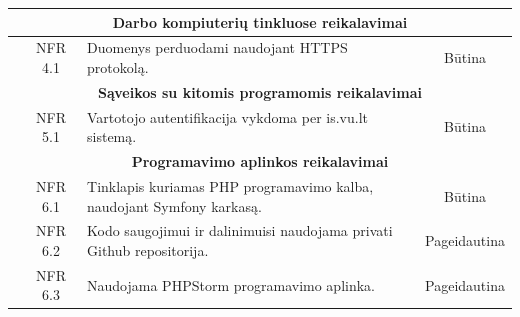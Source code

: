\documentclass{VUMIFPSkursinis}
\begin{document}
\begin{table}[H]
\begin{tabular}{|p{1cm}|p{1cm}|p{}|p{}|}
	\hline
\multicolumn{4}{|c|}{\bfseries Darbo kompiuterių tinkluose reikalavimai}\\		
			
	\hline
		\multicolumn{1}{|c}{}&
		\multicolumn{1}{c|}{NFR 4.1}&
		{Duomenys perduodami naudojant HTTPS protokolą.
		}&
		\multicolumn{1}{c|}{Būtina}\\	
		
	\hline
\multicolumn{4}{|c|}{\bfseries Sąveikos su kitomis programomis reikalavimai}\\	
\hline
		\multicolumn{1}{|c}{}&
		\multicolumn{1}{c|}{NFR 5.1}&
		{Vartotojo autentifikacija vykdoma per is.vu.lt sistemą.
		}&
		\multicolumn{1}{c|}{Būtina}\\
		
	\hline
\multicolumn{4}{|c|}{\bfseries Programavimo aplinkos reikalavimai}\\	
\hline
		\multicolumn{1}{|c}{}&
		\multicolumn{1}{c|}{NFR 6.1}&
		{Tinklapis kuriamas PHP programavimo kalba, naudojant
Symfony karkasą.
		}&
		\multicolumn{1}{c|}{Būtina}\\		

\hline
		\multicolumn{1}{|c}{}&
		\multicolumn{1}{c|}{NFR 6.2}&
		{Kodo saugojimui ir dalinimuisi naudojama privati Github repositorija.
		}&
		\multicolumn{1}{c|}{Pageidautina}\\	
		
\hline
		\multicolumn{1}{|c}{}&
		\multicolumn{1}{c|}{NFR 6.3}&
		{Naudojama PHPStorm programavimo aplinka.
		}&
		\multicolumn{1}{c|}{Pageidautina}\\									

	\hline
	\end{tabular}		
	\end{table}
	
	
\end{document}

